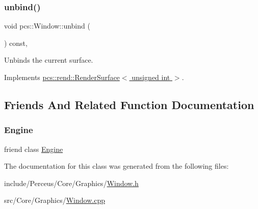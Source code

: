 \subsubsection{\texorpdfstring{unbind()}{unbind()}}
{\footnotesize\ttfamily void pcs\+::\+Window\+::unbind (\begin{DoxyParamCaption}{ }\end{DoxyParamCaption}) const\hspace{0.3cm}{\ttfamily [override]}, {\ttfamily [virtual]}}



Unbinds the current surface. 



Implements \hyperlink{classpcs_1_1rend_1_1RenderSurface_aacb7218feb1973ee4b0486494fcd8c88}{pcs\+::rend\+::\+Render\+Surface$<$ unsigned int $>$}.



\subsection{Friends And Related Function Documentation}
\mbox{\label{classpcs_1_1Window_a3e1914489e4bed4f9f23cdeab34a43dc}} 
\subsubsection{\texorpdfstring{Engine}{Engine}}
{\footnotesize\ttfamily friend class \hyperlink{classpcs_1_1Engine}{Engine}\hspace{0.3cm}{\ttfamily [friend]}}



The documentation for this class was generated from the following files\+:\begin{DoxyCompactItemize}
\item 
include/\+Perceus/\+Core/\+Graphics/\hyperlink{Window_8h}{Window.\+h}\item 
src/\+Core/\+Graphics/\hyperlink{Window_8cpp}{Window.\+cpp}\end{DoxyCompactItemize}

